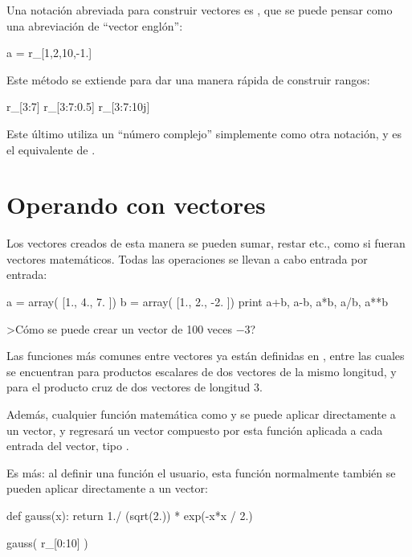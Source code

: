 Una notación abreviada para construir vectores es , que se puede pensar como una abreviación de ``vector englón'':
\begin{python}
a = r_[1,2,10,-1.]
\end{python}
Este método se extiende para dar una manera rápida de construir rangos:
\begin{python}
r_[3:7]
r_[3:7:0.5]
r_[3:7:10j]
\end{python}
Este último utiliza un ``número complejo'' simplemente como otra notación, y es el equivalente de .




\section{Operando con vectores}

Los vectores creados de esta manera se pueden sumar, restar etc., como si fueran vectores matemáticos. Todas las operaciones se llevan a cabo entrada por entrada:
\begin{python}
a = array( [1., 4., 7. ])
b = array( [1., 2., -2. ])
print a+b, a-b, a*b, a/b, a**b
\end{python}

\ej >Cómo se puede crear un vector de 100 veces $-3$?

Las funciones más comunes entre vectores ya están definidas en , entre las cuales se encuentran  para productos escalares de dos vectores de la mismo longitud, y  para el producto cruz de dos vectores de longitud $3$.

Además, cualquier función matemática como  y  se puede aplicar directamente a un vector, y regresará un vector compuesto por esta función aplicada a cada entrada del vector, tipo .

Es más: al definir una función el usuario, esta función normalmente también se pueden aplicar directamente a un vector:
\begin{python}
def gauss(x):
  return 1./ (sqrt(2.)) * exp(-x*x / 2.)

gauss( r_[0:10] )
\end{python}

